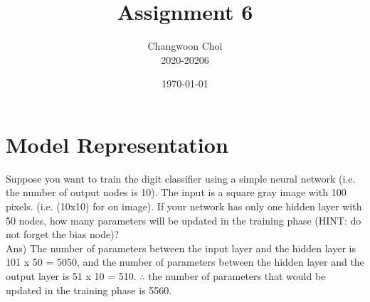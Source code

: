 \documentclass[12pt]{article}%
\begin{document}
\title{Assignment 6}
\author{Changwoon Choi \\ 2020-20206}
\date{\today}
\maketitle

\section{Model Representation}
Suppose you want to train the digit classifier using a simple neural network (i.e. the number of output nodes is 10). The input is a square gray image with 100 pixels. (i.e. (10x10) for on image). If your network has only one hidden layer with 50 nodes, how many parameters will be updated in the training phase (HINT: do not forget the bias node)?
\\

Ans) The number of  parameters between the input layer and the hidden layer is 101 x 50 = 5050, and the number of parameters between the hidden layer and the output layer is 51 x 10 = 510. $\therefore$ the number of parameters that would be updated in the training phase is 5560.
\end{document}
